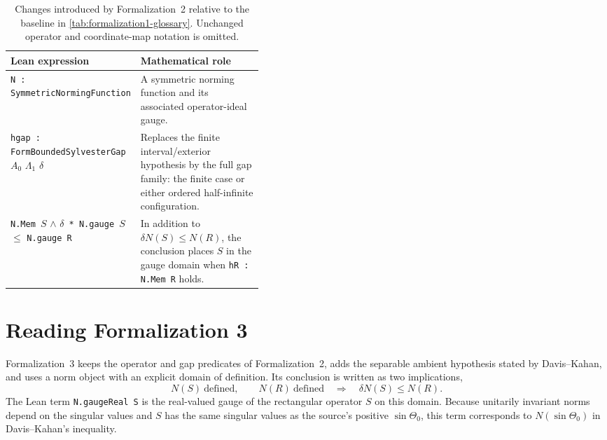 \begin{table}[H]
\centering
\small
\caption{Changes introduced by Formalization~2 relative to the baseline in
\cref{tab:formalization1-glossary}.  Unchanged operator and coordinate-map
notation is omitted.}
\label{tab:formalization2-glossary}
\begin{tabularx}{\linewidth}{@{}>{\raggedright\arraybackslash}p{0.42\linewidth}>{\raggedright\arraybackslash}X@{}}
\toprule
Lean expression & Mathematical role \\
\midrule
\texttt{N : SymmetricNormingFunction}
  & A symmetric norming function and its associated operator-ideal gauge. \\
\texttt{hgap : FormBoundedSylvesterGap }$A_0$ $\Lambda_1$ $\delta$
  & Replaces the finite interval/exterior hypothesis by the full gap family:
    the finite case or either ordered half-infinite configuration. \\
\texttt{N.Mem }$S$ $\land$ $\delta$\texttt{ * N.gauge }$S$
$\le$ \texttt{N.gauge R}
  & In addition to $\delta N(S)\le N(R)$, the conclusion places $S$ in the
    gauge domain when \texttt{hR : N.Mem R} holds. \\
\bottomrule
\end{tabularx}
\end{table}

\section{Reading Formalization 3}
\label{app:formalization3}

Formalization~3 keeps the operator and gap predicates of Formalization~2,
adds the separable ambient hypothesis stated by Davis--Kahan, and uses a norm
object with an explicit domain of definition.  Its conclusion is written as two
implications,
\[
  N(S)\ \text{defined},\qquad N(R)\ \text{defined}
  \quad\Longrightarrow\quad
  \delta N(S)\le N(R).
\]
The Lean term \texttt{N.gaugeReal S} is the real-valued gauge of the rectangular
operator $S$ on this domain.  Because unitarily invariant norms depend on the
singular values and $S$ has the same singular values as the source's positive
$\sin\Theta_0$, this term corresponds to $N(\sin\Theta_0)$ in Davis--Kahan's
inequality.

